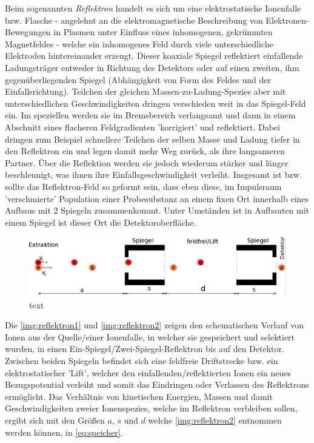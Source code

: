 \documentclass[numbers=noenddot,a4paper,notitlepage,twoside,BCOR15mm]{scrartcl}
\newcommand{\tilt}[1]{\textit{#1}}
\begin{document}
		Beim sogenannten \tilt{Reflektron} handelt es sich um eine elektrostatische Ionenfalle bzw. Flasche - angelehnt an die elektromagnetische Beschreibung von Elektronen-Bewegungen in Plasmen unter Einfluss eines inhomogenen, gekrümmten Magnetfeldes - welche ein inhomogenes Feld durch viele unterschiedliche Elektroden hintereinander erzeugt. Dieser koaxiale Spiegel reflektiert einfallende Ladungsträger entweder in Richtung des Detektors oder auf einen zweiten, ihm gegenüberliegenden Spiegel (Abhängigkeit von Form des Feldes und der Einfallsrichtung). Teilchen der gleichen Massen-zu-Ladung-Spezies aber mit unterschiedlichen Geschwindigkeiten dringen verschieden weit in das Spiegel-Feld ein. Im speziellen werden sie im Bremsbereich verlangsamt und dann in einem Abschnitt eines flacheren Feldgradienten 'korrigiert' und reflektiert. Dabei dringen zum Beispiel schnellere Teilchen der selben Masse und Ladung tiefer in den Reflektron ein und legen damit mehr Weg zurück, als ihre langsameren Partner. Über die Reflektion werden sie jedoch wiederum stärker und länger beschleunigt, was ihnen ihre Einfallsgeschwindigkeit verleiht. Insgesamt ist bzw. sollte das Reflektron-Feld so geformt sein, dass eben diese, im Impulsraum 'verschmierte' Population einer Probesubstanz an einem fixen Ort innerhalb eines Aufbaus mit 2 Spiegeln zusammenkommt. Unter Umständen ist in Aufbauten mit einem Spiegel ist dieser Ort die Detektoroberfläche.

			\begin{figure}[b]
				\centering
				\includegraphics[width=\textwidth]{zweispiegel.png}
				\caption{text}
				\label{img:reflektron2}
			\end{figure}

		Die \autoref{img:reflektron1} und \autoref{img:reflektron2} zeigen den schematischen Verlauf von Ionen aus der Quelle/einer Ionenfalle, in welcher sie gespeichert und selektiert wurden, in einen Ein-Spiegel/Zwei-Spiegel-Reflektron bis auf den Detektor. Zwischen beiden Spiegeln befindet sich eine feldfreie Driftstrecke bzw. ein elektrostatischer 'Lift', welcher den einfallenden/reflektierten Ionen ein neues Bezugspotential verleiht und somit das Eindringen oder Verlassen des Reflektrons ermöglicht. Das Verhältnis von kinetischen Energien, Massen und damit Geschwindigkeiten zweier Ionenspezies, welche im Reflektron verbleiben sollen, ergibt sich mit den Größen $a$, $s$ und $d$ welche \autoref{img:reflektron2} entnommen werden können, in \autoref{eq:speicher}.
\end{document}
